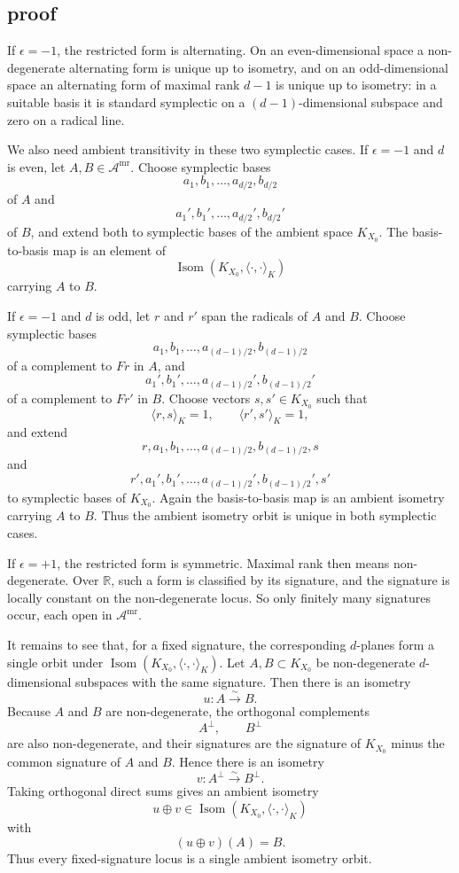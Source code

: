 \documentclass[
  11pt,
]{article}
\begin{document}
\subsection{proof}\label{proof-4}

If \(\epsilon=-1\), the restricted form is alternating. On an
even-dimensional space a non-degenerate alternating form is unique up to
isometry, and on an odd-dimensional space an alternating form of maximal
rank \(d-1\) is unique up to isometry: in a suitable basis it is
standard symplectic on a \((d-1)\)-dimensional subspace and zero on a
radical line.

We also need ambient transitivity in these two symplectic cases. If
\(\epsilon=-1\) and \(d\) is even, let
\(A,B\in \mathscr A^{\mathrm{mr}}\). Choose symplectic bases \[
a_1,b_1,\dots,a_{d/2},b_{d/2}
\] of \(A\) and \[
a_1',b_1',\dots,a_{d/2}',b_{d/2}'
\] of \(B\), and extend both to symplectic bases of the ambient space
\(K_{X_0}\). The basis-to-basis map is an element of \[
\operatorname{Isom}(K_{X_0},\langle\cdot,\cdot\rangle_K)
\] carrying \(A\) to \(B\).

If \(\epsilon=-1\) and \(d\) is odd, let \(r\) and \(r'\) span the
radicals of \(A\) and \(B\). Choose symplectic bases \[
a_1,b_1,\dots,a_{(d-1)/2},b_{(d-1)/2}
\] of a complement to \(Fr\) in \(A\), and \[
a_1',b_1',\dots,a_{(d-1)/2}',b_{(d-1)/2}'
\] of a complement to \(Fr'\) in \(B\). Choose vectors
\(s,s'\in K_{X_0}\) such that \[
\langle r,s\rangle_K=1,
\qquad
\langle r',s'\rangle_K=1,
\] and extend \[
r,a_1,b_1,\dots,a_{(d-1)/2},b_{(d-1)/2},s
\] and \[
r',a_1',b_1',\dots,a_{(d-1)/2}',b_{(d-1)/2}',s'
\] to symplectic bases of \(K_{X_0}\). Again the basis-to-basis map is
an ambient isometry carrying \(A\) to \(B\). Thus the ambient isometry
orbit is unique in both symplectic cases.

If \(\epsilon=+1\), the restricted form is symmetric. Maximal rank then
means non-degenerate. Over \(\mathbb R\), such a form is classified by
its signature, and the signature is locally constant on the
non-degenerate locus. So only finitely many signatures occur, each open
in \(\mathscr A^{\mathrm{mr}}\).

It remains to see that, for a fixed signature, the corresponding
\(d\)-planes form a single orbit under
\(\operatorname{Isom}(K_{X_0},\langle\cdot,\cdot\rangle_K)\). Let
\(A,B\subset K_{X_0}\) be non-degenerate \(d\)-dimensional subspaces
with the same signature. Then there is an isometry \[
u:A\xrightarrow{\sim} B.
\] Because \(A\) and \(B\) are non-degenerate, the orthogonal
complements \[
A^\perp,\qquad B^\perp
\] are also non-degenerate, and their signatures are the signature of
\(K_{X_0}\) minus the common signature of \(A\) and \(B\). Hence there
is an isometry \[
v:A^\perp\xrightarrow{\sim} B^\perp.
\] Taking orthogonal direct sums gives an ambient isometry \[
u\oplus v\in \operatorname{Isom}(K_{X_0},\langle\cdot,\cdot\rangle_K)
\] with \[
(u\oplus v)(A)=B.
\] Thus every fixed-signature locus is a single ambient isometry orbit.
\end{document}
